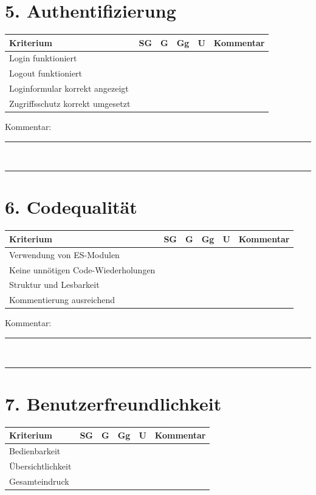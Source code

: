 \documentclass[a4paper,12pt]{article}
\begin{document}
\section*{5. Authentifizierung}

\begin{longtable}{|p{6cm}|c|c|c|c|p{4cm}|}
\hline
Kriterium & SG & G & Gg & U & Kommentar \\
\hline
Login funktioniert & & & & & \\
\hline
Logout funktioniert & & & & & \\
\hline
Loginformular korrekt angezeigt & & & & & \\
\hline
Zugriffsschutz korrekt umgesetzt & & & & & \\
\hline
\end{longtable}

Kommentar:\\
\rule{\textwidth}{0.4pt}\\
\rule{\textwidth}{0.4pt}

\section*{6. Codequalität}

\begin{longtable}{|p{6cm}|c|c|c|c|p{4cm}|}
\hline
Kriterium & SG & G & Gg & U & Kommentar \\
\hline
Verwendung von ES-Modulen & & & & & \\
\hline
Keine unnötigen Code-Wiederholungen & & & & & \\
\hline
Struktur und Lesbarkeit & & & & & \\
\hline
Kommentierung ausreichend & & & & & \\
\hline
\end{longtable}

Kommentar:\\
\rule{\textwidth}{0.4pt}\\
\rule{\textwidth}{0.4pt}

\section*{7. Benutzerfreundlichkeit}

\begin{longtable}{|p{6cm}|c|c|c|c|p{4cm}|}
\hline
Kriterium & SG & G & Gg & U & Kommentar \\
\hline
Bedienbarkeit & & & & & \\
\hline
Übersichtlichkeit & & & & & \\
\hline
Gesamteindruck & & & & & \\
\hline
\end{longtable}
\end{document}
